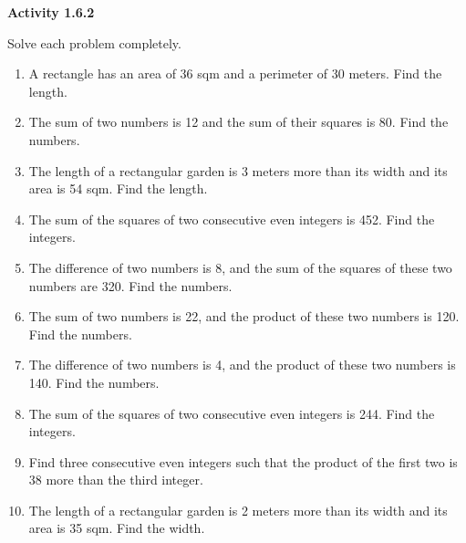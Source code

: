 \vspace{1ex}
\noindent\textbf{Activity 1.6.2}

\vspace{0.75ex}

Solve each problem completely.
\begin{enumerate}[label = \color{blue}\arabic*. ]
\item A rectangle has an area of 36 sqm and a perimeter of 30 meters. Find the length. 
\item The sum of two numbers is 12 and the sum of their squares is 80. Find the numbers. 
\item The length of a rectangular garden is 3 meters more than its width and its area is 54 sqm. Find the length. 
\item The sum of the squares of two consecutive even integers is 452. Find the integers. 
\item The difference of two numbers is 8, and the sum of the squares of these two numbers are 320. Find the numbers. 

\item The sum of two numbers is 22, and the product of these two numbers is 120. Find the numbers. 

\item The difference of two numbers is 4, and the product of these two numbers is 140. Find the numbers. 

\item The sum of the squares of two consecutive even integers is 244. Find the integers. 

\item Find three consecutive even integers such that the product of the first two is 38 more than the third integer. 

\item The length of a rectangular garden is 2 meters more than its width and its area is 35 sqm. Find the width. 
\end{enumerate}




